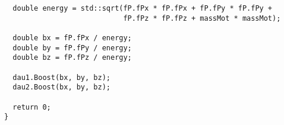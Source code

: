 \begin{lstlisting}
  double energy = std::sqrt(fP.fPx * fP.fPx + fP.fPy * fP.fPy +
                            fP.fPz * fP.fPz + massMot * massMot);

  double bx = fP.fPx / energy;
  double by = fP.fPy / energy;
  double bz = fP.fPz / energy;

  dau1.Boost(bx, by, bz);
  dau2.Boost(bx, by, bz);

  return 0;
}
\end{lstlisting}